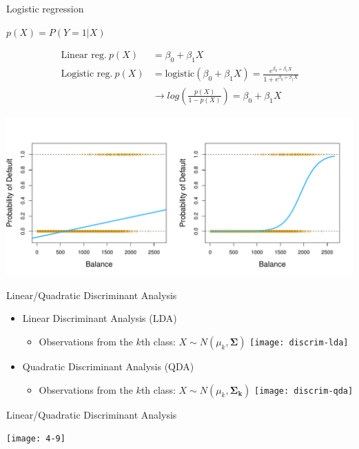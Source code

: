 \documentclass[14pt]{beamer}
\begin{document}
\begin{frame}{Logistic regression}
	
\centerline{$p(X) = P(Y = 1|X) $}
\vspace{-.6cm}
\begin{align*}
\text{Linear reg.} ~ p(X) &= \beta_0 + \beta_1 X \\
\text{Logistic reg.} ~ p(X) &= \text{logistic}(\beta_0 + \beta_1 X) = \frac{e^{\beta_0 + \beta_1 X}}{1 + e^{\beta_0 + \beta_1 X}} \\
&\rightarrow log(\frac{p(X)}{1 - p(X)}) = \beta_0 + \beta_1 X
\end{align*}
\vspace{-1cm}
\centerline{\includegraphics[width=.85\textwidth]{4-2}}

\end{frame}

\begin{frame}{\normalsize Linear/Quadratic Discriminant Analysis}

\begin{itemize}
	\item Linear Discriminant Analysis (LDA)
	\begin{itemize}
	\item Observations from the $k$th class: $X \sim N(\mu_k, \bm{\Sigma})$
	 \texttt{[image: discrim-lda]}
	\end{itemize}

	\item Quadratic Discriminant Analysis (QDA)
	\begin{itemize}
	\item Observations from the $k$th class: $X \sim N(\mu_k, \bm{\Sigma_k})$
	\texttt{[image: discrim-qda]}
	\end{itemize}
\end{itemize}

\end{frame}

\begin{frame}{\normalsize Linear/Quadratic Discriminant Analysis}


\centerline{\texttt{[image: 4-9]}}


\end{frame}
\end{document}
